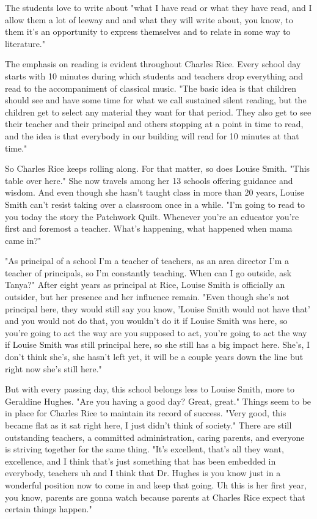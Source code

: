 The students love to write about "what I have read or what they have read, and I allow them a lot of leeway and and what they will write about, you know, to them it's an opportunity to express themselves and to relate in some way to literature."

The emphasis on reading is evident throughout Charles Rice. Every school day starts with 10 minutes during which students and teachers drop everything and read to the accompaniment of classical music. "The basic idea is that children should see and have some time for what we call sustained silent reading, but the children get to select any material they want for that period. They also get to see their teacher and their principal and others stopping at a point in time to read, and the idea is that everybody in our building will read for 10 minutes at that time."

So Charles Rice keeps rolling along. For that matter, so does Louise Smith. "This table over here." She now travels among her 13 schools offering guidance and wisdom. And even though she hasn't taught class in more than 20 years, Louise Smith can't resist taking over a classroom once in a while. "I'm going to read to you today the story the Patchwork Quilt. Whenever you're an educator you're first and foremost a teacher. What's happening, what happened when mama came in?"

"As principal of a school I'm a teacher of teachers, as an area director I'm a teacher of principals, so I'm constantly teaching. When can I go outside, ask Tanya?" After eight years as principal at Rice, Louise Smith is officially an outsider, but her presence and her influence remain. "Even though she's not principal here, they would still say you know, 'Louise Smith would not have that' and you would not do that, you wouldn't do it if Louise Smith was here, so you're going to act the way are you supposed to act, you're going to act the way if Louise Smith was still principal here, so she still has a big impact here. She's, I don't think she's, she hasn't left yet, it will be a couple years down the line but right now she's still here."

But with every passing day, this school belongs less to Louise Smith, more to Geraldine Hughes. "Are you having a good day? Great, great." Things seem to be in place for Charles Rice to maintain its record of success. "Very good, this became flat as it sat right here, I just didn't think of society." There are still outstanding teachers, a committed administration, caring parents, and everyone is striving together for the same thing. "It's excellent, that's all they want, excellence, and I think that's just something that has been embedded in everybody, teachers uh and I think that Dr. Hughes is you know just in a wonderful position now to come in and keep that going. Uh this is her first year, you know, parents are gonna watch because parents at Charles Rice expect that certain things happen."

